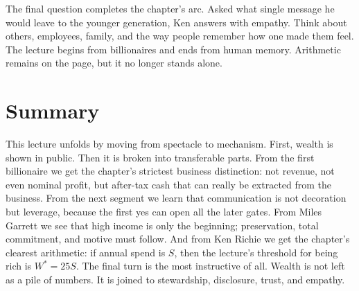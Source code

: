 The final question completes the chapter's arc. Asked what single message he would leave to the younger generation, Ken answers with empathy. Think about others, employees, family, and the way people remember how one made them feel. The lecture begins from billionaires and ends from human memory. Arithmetic remains on the page, but it no longer stands alone.

\section{Summary}

This lecture unfolds by moving from spectacle to mechanism. First, wealth is shown in public. Then it is broken into transferable parts. From the first billionaire we get the chapter's strictest business distinction: not revenue, not even nominal profit, but after-tax cash that can really be extracted from the business. From the next segment we learn that communication is not decoration but leverage, because the first yes can open all the later gates. From Miles Garrett we see that high income is only the beginning; preservation, total commitment, and motive must follow. And from Ken Richie we get the chapter's clearest arithmetic: if annual spend is \(S\), then the lecture's threshold for being rich is \(W^\ast = 25S\). The final turn is the most instructive of all. Wealth is not left as a pile of numbers. It is joined to stewardship, disclosure, trust, and empathy.